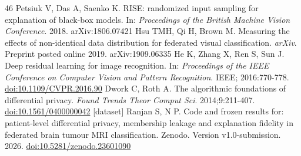\begin{thebibliography}{46}
 Petsiuk V, Das A, Saenko K. RISE: randomized input sampling for explanation of black-box models. In: \textit{Proceedings of the British Machine Vision Conference}. 2018. arXiv:1806.07421
 Hsu TMH, Qi H, Brown M. Measuring the effects of non-identical data distribution for federated visual classification. \textit{arXiv}. Preprint posted online 2019. arXiv:1909.06335
 He K, Zhang X, Ren S, Sun J. Deep residual learning for image recognition. In: \textit{Proceedings of the IEEE Conference on Computer Vision and Pattern Recognition}. IEEE; 2016:770-778. \href{https://doi.org/10.1109/CVPR.2016.90}{doi:10.1109/CVPR.2016.90}
 Dwork C, Roth A. The algorithmic foundations of differential privacy. \textit{Found Trends Theor Comput Sci}. 2014;9:211-407. \href{https://doi.org/10.1561/0400000042}{doi:10.1561/0400000042}
 [dataset] Ranjan S, N P. Code and frozen results for: patient-level differential privacy, membership leakage and explanation fidelity in federated brain tumour MRI classification. Zenodo. Version v1.0-submission. 2026. \href{https://doi.org/10.5281/zenodo.23601090}{doi:10.5281/zenodo.23601090}
\end{thebibliography}
